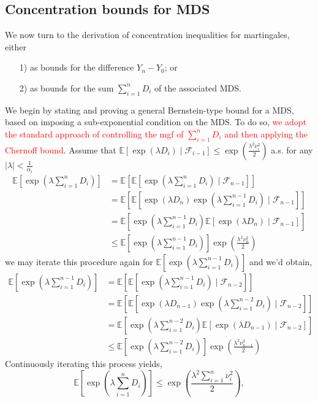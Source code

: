 \documentclass[10pt,handout,english]{beamer}
\newcommand{\E}{\mathbb{E}}
\newcommand{\F}{\mathcal{F}}
\newcommand{\1}{\mathbbm{1}}
\begin{document}
\subsection{Concentration bounds for MDS}
\begin{frame}[allowframebreaks]
We now turn to the derivation of concentration inequalities for martingales, either
\begin{itemize}
\item[1)] as bounds for the difference $Y_n-Y_0$; or
\item[2)] as bounds for the sum $\sum_{i=1}^nD_i$ of the associated MDS.
\end{itemize}
We begin by stating and proving a general Bernstein-type bound for a MDS, based on imposing a sub-exponential condition on the MDS. To do so, \textcolor{red}{we adopt the standard approach of controlling the mgf of $\sum_{i=1}^{n}D_i$ and then applying the Chernoff bound}. Assume that $\E[\exp(\lambda D_i)\mid\F_{i-1}]\leq\exp\left(\frac{\lambda^2\nu^2_i}{2}\right)$ a.s. for any $\lvert\lambda\rvert<\frac{1}{\alpha_i}$
\begingroup
\allowdisplaybreaks
\begin{align*}
\E[\exp(\lambda\sum_{i=1}^n D_i)]&=\E[\E[\exp(\lambda\sum_{i=1}^n D_i)\mid\F_{n-1}]]\\
&=\E[\E[\exp(\lambda D_n)\exp(\lambda\sum_{i=1}^{n-1} D_i)\mid\F_{n-1}]]\\
&=\E[\exp(\lambda\sum_{i=1}^{n-1} D_i)\E[\exp(\lambda D_n)\mid\F_{n-1}]]\\
&\leq\E[\exp(\lambda\sum_{i=1}^{n-1} D_i)]\exp\left(\frac{\lambda^2\nu^2_n}{2}\right)
\end{align*} 
\endgroup
we may iterate this procedure again for $\E[\exp(\lambda\sum_{i=1}^{n-1} D_i)]$ and we'd obtain,
\begingroup
\allowdisplaybreaks
\begin{align*}
\E[\exp(\lambda\sum_{i=1}^{n-1} D_i)]&=\E[\E[\exp(\lambda\sum_{i=1}^{n-1} D_i)\mid\F_{n-2}]]\\
&=\E[\E[\exp(\lambda D_{n-1})\exp(\lambda\sum_{i=1}^{n-2} D_i)\mid\F_{n-2}]]\\
&=\E[\exp(\lambda\sum_{i=1}^{n-2} D_i)\E[\exp(\lambda D_{n-1})\mid\F_{n-2}]]\\
&\leq\E[\exp(\lambda\sum_{i=1}^{n-2} D_i)]\exp\left(\frac{\lambda^2\nu^2_{n-1}}{2}\right)
\end{align*} 
\endgroup
Continuously iterating this process yields,
\[
\E[\exp(\lambda\sum_{i=1}^n D_i)]\leq\exp\left(\frac{\lambda^2\sum_{i=1}^{n}\nu_i^2}{2}\right), 
\]
\end{frame}
\end{document}
